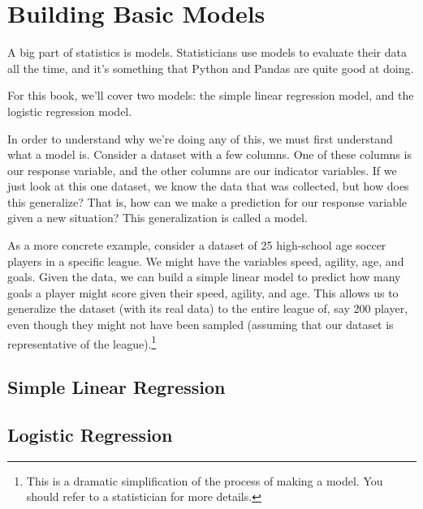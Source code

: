 \section{Building Basic Models}
A big part of statistics is models. Statisticians use models to evaluate their data all the time, and it's something that Python and Pandas are quite good at doing.\par
For this book, we'll cover two models: the simple linear regression model, and the logistic regression model.\par
In order to understand why we're doing any of this, we must first understand what a model is. Consider a dataset with a few columns. One of these columns is our response variable, and the other columns are our indicator variables. If we just look at this one dataset, we know the data that was collected, but how does this generalize? That is, how can we make a prediction for our response variable given a new situation? This generalization is called a model.\par
As a more concrete example, consider a dataset of 25 high-school age soccer players in a specific league. We might have the variables  speed, agility, age, and goals. Given the data, we can build a simple linear model to predict how many goals a player might score given their speed, agility, and age. This allows us to generalize the dataset (with its real data) to the entire league of, say 200 player, even though they might not have been sampled (assuming that our dataset is representative of the league).\footnote{This is a dramatic simplification of the process of making a model. You should refer to a statistician for more details.}
\subsection{Simple Linear Regression}
\subsection{Logistic Regression}
